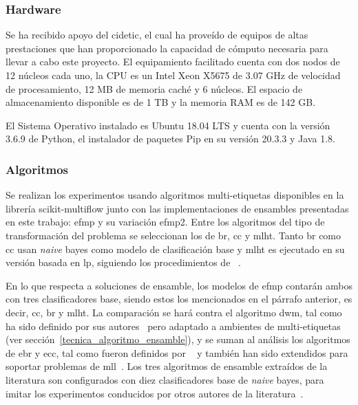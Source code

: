 \subsubsection{Hardware}

Se ha recibido apoyo del \acrfull{cidetic}, el cual ha proveído de equipos de
altas prestaciones que han proporcionado la capacidad de cómputo necesaria para
llevar a cabo este proyecto. El equipamiento facilitado cuenta con dos nodos de
12 núcleos cada uno, la CPU es un Intel Xeon X5675 de 3.07 GHz de velocidad de
procesamiento, 12 MB de memoria caché y 6 núcleos. El espacio de almacenamiento
disponible es de 1 TB y la memoria RAM es de 142 GB\@.

El Sistema Operativo instalado es Ubuntu 18.04 LTS y cuenta con la versión 3.6.9
de Python, el instalador de paquetes Pip en su versión 20.3.3 y Java 1.8.

\subsubsection{Algoritmos}
\label{experimentos_algoritmos}

Se realizan los experimentos usando algoritmos multi-etiquetas disponibles en la
librería scikit-multiflow junto con las implementaciones de ensambles
presentadas en este trabajo: \acrfull{efmp} y su variación \acrshort{efmp2}.
Entre los algoritmos del tipo de transformación del problema se seleccionan los
de \acrfull{br}, \acrfull{cc} y \acrfull{mlht}. Tanto \acrshort{br} como
\acrshort{cc} usan \textit{naive} bayes como modelo de clasificación base y
\acrshort{mlht} es ejecutado en su versión basada en \acrfull{lp}, siguiendo los
procedimientos de \citeauthor{read_scalable_2012}~\cite{read_scalable_2012}.

En lo que respecta a soluciones de ensamble, los modelos de \acrshort{efmp}
contarán ambos con tres clasificadores base, siendo estos los mencionados en el
párrafo anterior, es decir, \acrshort{cc}, \acrshort{br} y \acrshort{mlht}. La
comparación se hará contra el algoritmo \acrfull{dwm}, tal como ha sido definido
por sus autores~\cite{kolter_dynamic_2007} pero adaptado a ambientes de
multi-etiquetas (ver sección~\ref{tecnica_algoritmo_ensamble}), y se suman al
análisis los algoritmos de \acrfull{ebr} y \acrfull{ecc}, tal como fueron
definidos por \citeauthor{oza_online_2005}~\cite{oza_online_2005} y también han
sido extendidos para soportar problemas de
\acrshort{mll}~\cite{read_classifier_2011}. Los tres algoritmos de ensamble
extraídos de la literatura son configurados con diez clasificadores base de
\textit{naive} bayes, para imitar los experimentos conducidos por otros autores
de la literatura~\cite{osojnik_multi-label_2017, read_scalable_2012,
	buyukcakir_novel_2018}.

